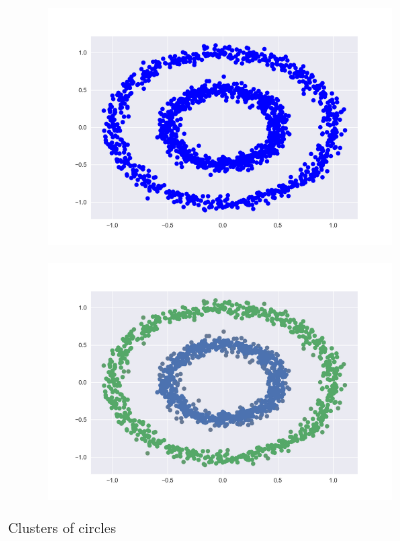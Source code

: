 \documentclass{article}
\begin{document}
\begin{figure}[h!]
	\begin{subfigure}{.5\textwidth}
		\centering
		\includegraphics[width=\linewidth]{c_figure_1.png}
		\caption{}
	\end{subfigure}%
	\begin{subfigure}{.5\textwidth}
		\centering
		\includegraphics[width=\linewidth]{c_figure_2.png}
		\caption{}
	\end{subfigure}
	\caption{Clusters of circles}
\end{figure}
\end{document}
